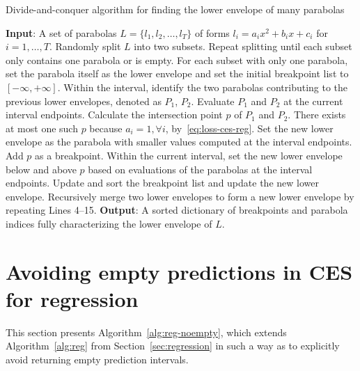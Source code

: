 
\begin{algorithm}[H]
    \caption{Divide-and-conquer algorithm for finding the lower envelope of many parabolas}
    \label{alg:envelope}
    \begin{algorithmic} [1]
        \STATE \textbf{Input}: A set of parabolas $L = \{l_1, l_2, \dots, l_T \}$ of forms $l_i = a_i x^2 + b_i x + c_i$ for $i=1,\dots, T$.
        \STATE Randomly split $L$ into two subsets. Repeat splitting until each subset only contains one parabola or is empty.
        \STATE For each subset with only one parabola, set the parabola itself as the lower envelope and set the initial breakpoint list to $[-\infty, +\infty]$.
            \STATE Within the interval, identify the two parabolas contributing to the previous lower envelopes, denoted as $P_1$, $P_2$.
            \STATE Evaluate $P_1$ and $P_2$ at the current interval endpoints.
            \STATE Calculate the intersection point $p$ of $P_1$ and $P_2$. There exists at most one such $p$ because $a_i = 1, \forall i$, by~\eqref{eq:loss-ces-reg}.
            \STATE Set the new lower envelope as the parabola with smaller values computed at the interval endpoints.
            \ELSE \STATE Add $p$ as a breakpoint.
            \STATE Within the current interval, set the new lower envelope below and above $p$ based on evaluations of the parabolas at the interval endpoints.
            \ENDIF
            \STATE Update and sort the breakpoint list and update the new lower envelope.
        \ENDFOR
        \STATE Recursively merge two lower envelopes to form a new lower envelope by repeating Lines 4--15.
        \STATE \textbf{Output}: A sorted dictionary of breakpoints and parabola indices fully characterizing the lower envelope of $L$.
\end{algorithmic}
\end{algorithm}



\section{Avoiding empty predictions in CES for regression} \label{app:reg-noempty}

This section presents Algorithm~\ref{alg:reg-noempty}, which extends Algorithm~\ref{alg:reg} from Section~\ref{sec:regression} in such a way as to explicitly avoid returning empty prediction intervals.

